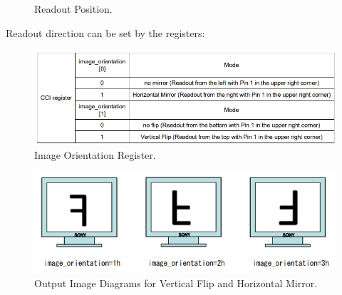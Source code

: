 \documentclass[10pt]{article}
\begin{document}
\begin{multicols}{2}
\begin{figure}[H]
    \caption{Readout Position.}
\end{figure}
Readout direction can be set by the registers:
\begin{figure}[H]
    \centering
    \includegraphics[width=1\linewidth]{Images/Week 2/readout-table.png}
    \caption{Image Orientation Register.}
\end{figure}
\begin{figure}[H]
    \centering
    \includegraphics[width=1\linewidth]{Images/Week 2/vh-mirror.png}
    \caption{Output Image Diagrams for Vertical Flip and Horizontal Mirror.}
\end{figure}


\end{multicols}
\end{document}
